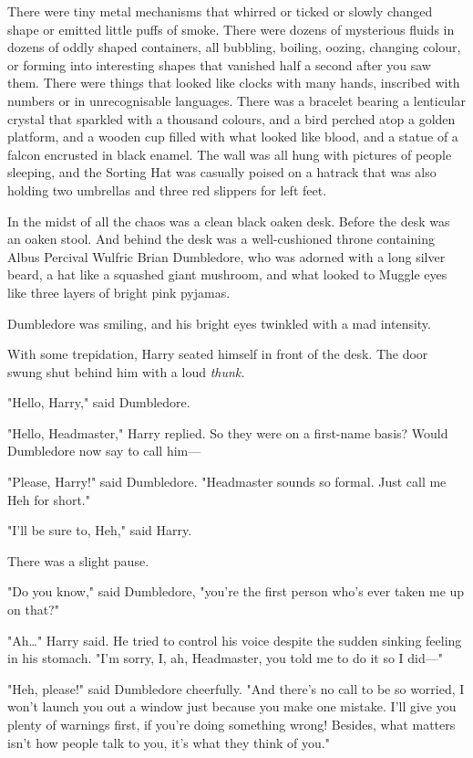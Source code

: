 There were tiny metal mechanisms that whirred or ticked or slowly changed shape
or emitted little puffs of smoke. There were dozens of mysterious fluids in
dozens of oddly shaped containers, all bubbling, boiling, oozing, changing
colour, or forming into interesting shapes that vanished half a second after you
saw them. There were things that looked like clocks with many hands, inscribed
with numbers or in unrecognisable languages. There was a bracelet bearing a
lenticular crystal that sparkled with a thousand colours, and a bird perched
atop a golden platform, and a wooden cup filled with what looked like blood,
and a statue of a falcon encrusted in black enamel. The wall was all hung with
pictures of people sleeping, and the Sorting Hat was casually poised on a
hatrack that was also holding two umbrellas and three red slippers for left
feet.

In the midst of all the chaos was a clean black oaken desk. Before the desk was
an oaken stool. And behind the desk was a well-cushioned throne containing
Albus Percival Wulfric Brian Dumbledore, who was adorned with a long silver
beard, a hat like a squashed giant mushroom, and what looked to Muggle eyes
like three layers of bright pink pyjamas.

Dumbledore was smiling, and his bright eyes twinkled with a mad intensity.

With some trepidation, Harry seated himself in front of the desk. The door
swung shut behind him with a loud \emph{thunk.}

"Hello, Harry," said Dumbledore.

"Hello, Headmaster," Harry replied. So they were on a first-name basis? Would
Dumbledore now say to call him—

"Please, Harry!" said Dumbledore. "Headmaster sounds so formal. Just call me
Heh for short."

"I’ll be sure to, Heh," said Harry.

There was a slight pause.

"Do you know," said Dumbledore, "you’re the first person who’s ever taken me up
on that?"

"Ah…" Harry said. He tried to control his voice despite the sudden
sinking feeling in his stomach. "I’m sorry, I, ah, Headmaster, you told me to
do it so I did—"

"Heh, please!" said Dumbledore cheerfully. "And there’s no call to be so
worried, I won’t launch you out a window just because you make one mistake.
I’ll give you plenty of warnings first, if you’re doing something wrong!
Besides, what matters isn’t how people talk to you, it’s what they think of
you."

